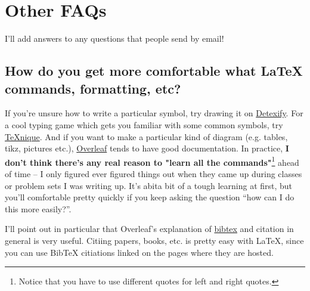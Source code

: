 \documentclass[11pt]{article}
\begin{document}
\section{Other FAQs}
I'll add answers to any questions that people send by email!
\subsection*{How do you get more comfortable what LaTeX commands, formatting, etc?}
If you're unsure how to write a particular symbol, try drawing it on
\href{https://detexify.kirelabs.org/}{Detexify}. For a cool typing game which
gets you familiar with some common symbols, try
\href{https://texnique.xyz/}{TeXnique}. And if you want to make a particular
kind of diagram (e.g. tables, tikz, pictures etc.),
\href{https://overleaf.com}{Overleaf} tends to have good documentation. In
practice, \textbf{I don't think there's any real reason to "learn all the
    commands"}\footnote{Notice that you have to use different quotes for left and right quotes.} ahead of time -- I only figured ever figured things out
when they came up during classes or problem sets I was writing up. It's abita
bit of a tough learning at first, but you'll comfortable pretty quickly if you
keep asking the question ``how can I do this more easily?''.

I'll point out in particular that Overleaf's explanation of
\href{https://bibtex.org}{bibtex} and citation in general is very useful.
Citiing papers, books, etc. is pretty easy with LaTeX, since you can use BibTeX
citiations linked on the pages where they are hosted.
\end{document}
